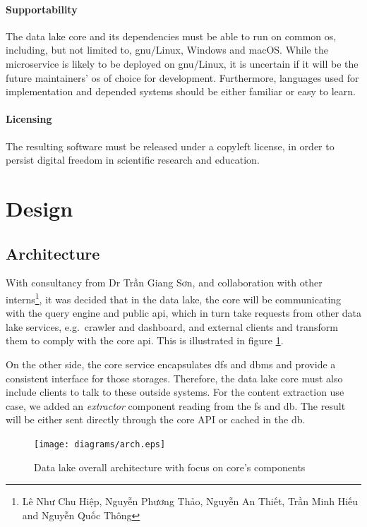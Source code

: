 \documentclass[a4paper,oneside,12pt]{book}
\begin{document}
\paragraph{Supportability}  The data lake core and its dependencies must
be able to run on common \gls{os}, including, but not limited to,
\acrshort{gnu}/Linux, Windows and macOS.  While the microservice is likely
to be deployed on \acrshort{gnu}/Linux, it is uncertain if it will be
the future maintainers' \gls{os} of choice for development.  Furthermore,
languages used for implementation and depended systems should be
either familiar or easy to learn.

\paragraph{Licensing}  The resulting software must be released under
a copyleft license, in order to persist digital freedom in scientific research
and education.

\section{Design}

\subsection{Architecture}
With consultancy from Dr {Trần Giang Sơn},
and collaboration with other interns\footnote{Lê
Như Chu Hiệp, Nguyễn Phương Thảo, Nguyễn An Thiết, Trần Minh Hiếu
and Nguyễn Quốc Thông}, it was decided that in the data lake, the core
will be communicating with the query engine and public \gls{api}, which in
turn take requests from other data lake services, e.g.~crawler and dashboard,
and external clients and transform them to comply with the core \gls{api}.
This is illustrated in figure \ref{arch}.

On the other side, the core service encapsulates \gls{dfs} and \gls{dbms}
and provide a consistent interface for those storages.  Therefore,
the data lake core must also include clients to talk to these outside systems.
For the content extraction use case, we added an \emph{extractor} component
reading from the \gls{fs} and \gls{db}.  The result will be either sent
directly through the core API or cached in the \gls{db}.

\begin{figure}\centering
  \texttt{[image: diagrams/arch.eps]}
  \caption{Data lake overall architecture with focus on core's components}
  \label{arch}
\end{figure}
\end{document}
